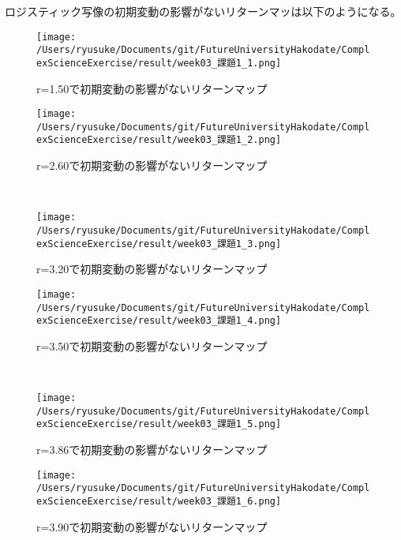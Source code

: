 \documentclass[dvipdfmx,uplatex]{jsarticle}
\begin{document}
ロジスティック写像の初期変動の影響がないリターンマッは以下のようになる。

\begin{figure}[htbp]
 \begin{minipage}{0.5\hsize}
  \begin{center}
   \texttt{[image: /Users/ryusuke/Documents/git/FutureUniversityHakodate/ComplexScienceExercise/result/week03\_課題1\_1.png]}
  \end{center}
  \caption{r=1.50で初期変動の影響がないリターンマップ}
  \label{fig:return-one}
 \end{minipage}
 \begin{minipage}{0.5\hsize}
  \begin{center}
   \texttt{[image: /Users/ryusuke/Documents/git/FutureUniversityHakodate/ComplexScienceExercise/result/week03\_課題1\_2.png]}
  \end{center}
  \caption{r=2.60で初期変動の影響がないリターンマップ}
  \label{fig:return-two}
 \end{minipage} \\
 \begin{minipage}{0.5\hsize}
  \begin{center}
   \texttt{[image: /Users/ryusuke/Documents/git/FutureUniversityHakodate/ComplexScienceExercise/result/week03\_課題1\_3.png]}
  \end{center}
  \caption{r=3.20で初期変動の影響がないリターンマップ}
  \label{fig:return-three}
 \end{minipage}
 \begin{minipage}{0.5\hsize}
  \begin{center}
   \texttt{[image: /Users/ryusuke/Documents/git/FutureUniversityHakodate/ComplexScienceExercise/result/week03\_課題1\_4.png]}
  \end{center}
  \caption{r=3.50で初期変動の影響がないリターンマップ}
  \label{fig:return-four}
 \end{minipage} \\
 \begin{minipage}{0.5\hsize}
  \begin{center}
   \texttt{[image: /Users/ryusuke/Documents/git/FutureUniversityHakodate/ComplexScienceExercise/result/week03\_課題1\_5.png]}
  \end{center}
  \caption{r=3.86で初期変動の影響がないリターンマップ}
  \label{fig:return-five}
 \end{minipage}
 \begin{minipage}{0.5\hsize}
  \begin{center}
   \texttt{[image: /Users/ryusuke/Documents/git/FutureUniversityHakodate/ComplexScienceExercise/result/week03\_課題1\_6.png]}
  \end{center}
  \caption{r=3.90で初期変動の影響がないリターンマップ}
  \label{fig:return-six}
 \end{minipage}
\end{figure}
\end{document}
